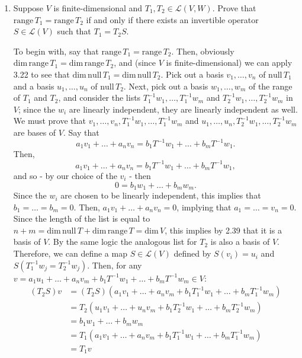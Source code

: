 \documentclass{book}
\begin{document}
\begin{enumerate}
\item Suppose \(V\) is finite-dimensional and \(T_1,T_2 \in \mathcal{L}(V,W)\).  Prove that \(\textrm{range} \, T_1=\textrm{range} \, T_2\) if and only if there exists an invertible operator \(S \in \mathcal{L}(V)\) such that \(T_1=T_2S\).

To begin with, say that \(\textrm{range} \, T_1=\textrm{range} \, T_2\).  Then, obviously \(\textrm{dim}\, \textrm{range} \, T_1 = \textrm{dim} \, \textrm{range} \, T_2\), and (since \(V\) is finite-dimensional) we can apply 3.22 to see that \(\textrm{dim}\, \textrm{null} \, T_1 = \textrm{dim} \, \textrm{null} \, T_2\).  Pick out a basis \(v_1,\dots,v_n\) of \(\textrm{null} \, T_1\) and a basis \(u_1,\dots,u_n\) of \(\textrm{null} \, T_2\).  Next, pick out a basis \(w_1,\dots,w_m\) of the range of \(T_1\) and \(T_2\), and consider the lists \(T_1^{-1}w_1,\dots,T_1^{-1}w_m\) and \(T_2^{-1}w_1,\dots,T_2^{-1}w_m\) in \(V\); since the \(w_i\) are linearly independent, they are linearly independent as well.  We must prove that \(v_1,\dots,v_n,T_1^{-1}w_1,\dots,T_1^{-1}w_m\) and \(u_1,\dots,u_n,T_2^{-1}w_1,\dots,T_2^{-1}w_m\) are bases of \(V\).  Say that \[a_1v_1+\dots+a_nv_n=b_1T^{-1}w_1+\dots+b_mT^{-1}w_1.\] Then, \[a_1v_1+\dots+a_nv_n=b_1T^{-1}w_1+\dots+b_mT^{-1}w_1,\] and so - by our choice of the \(v_i\) - then \[0=b_1w_1+\dots+b_mw_m.\] Since the \(w_i\) are chosen to be linearly independent, this implies that \(b_1=\dots=b_m=0\).  Then, \(a_1v_1+\dots+a_nv_n=0\), implying that \(a_1=\dots=v_n=0\).  Since the length of the list is equal to \(n+m=\textrm{dim} \, \textrm{null} \, T+\textrm{dim} \, \textrm{range} \, T=\textrm{dim} \, V\), this implies by 2.39 that it is a basis of \(V\).  By the same logic the analogous list for \(T_2\) is also a basis of \(V\).  Therefore, we can define a map \(S \in \mathcal{L}(V)\) defined by \(S(v_i)=u_i\) and \(S(T_1^{-1}w_j=T_2^{-1}w_j)\).  Then, for any \(v=a_1u_1+\dots+a_nv_m+b_1T^{-1}w_1+\dots+b_mT^{-1}w_m \in V\):
\begin{equation*}
\begin{split}
(T_2S)v &= (T_2S)(a_1v_1+\dots+a_nv_m+b_1T_1^{-1}w_1+\dots+b_mT_1^{-1}w_m) \\
&=T_2(u_1v_1+\dots+u_nv_m+b_1T_2^{-1}w_1+\dots+b_mT_2^{-1}w_m) \\
&=b_1w_1+\dots+b_mw_m \\
&=T_1(a_1v_1+\dots+a_nv_m+b_1T_1^{-1}w_1+\dots+b_mT_1^{-1}w_m) \\
&=T_1v
\end{split}
\end{equation*}


\end{enumerate}
\end{document}
